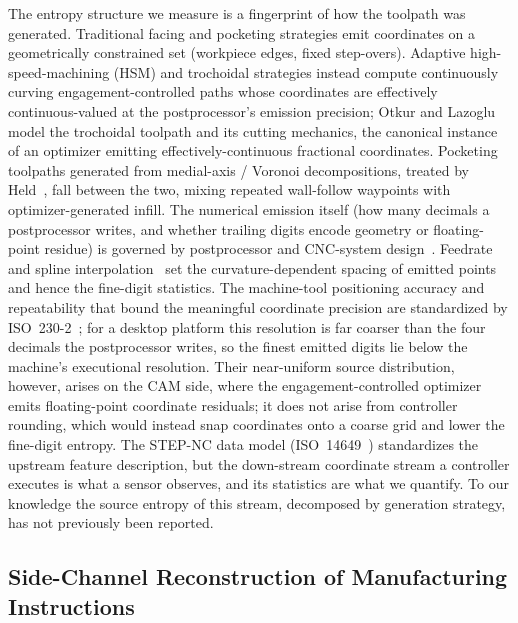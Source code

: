 \documentclass[entropy,article,submit,moreauthors,pdftex]{Definitions/mdpi}
\begin{document}
The entropy structure we measure is a fingerprint of how the toolpath was generated. Traditional facing and pocketing strategies emit coordinates on a geometrically constrained set (workpiece edges, fixed step-overs). Adaptive high-speed-machining (HSM) and trochoidal strategies instead compute continuously curving engagement-controlled paths whose coordinates are effectively continuous-valued at the postprocessor's emission precision; Otkur and Lazoglu~\cite{otkur2007trochoidal} model the trochoidal toolpath and its cutting mechanics, the canonical instance of an optimizer emitting effectively-continuous fractional coordinates. Pocketing toolpaths generated from medial-axis / Voronoi decompositions, treated by Held~\cite{held1991pocket}, fall between the two, mixing repeated wall-follow waypoints with optimizer-generated infill. The numerical emission itself (how many decimals a postprocessor writes, and whether trailing digits encode geometry or floating-point residue) is governed by postprocessor and CNC-system design~\cite{suh2008cnc}. Feedrate and spline interpolation~\cite{zhong2020interpolation} set the curvature-dependent spacing of emitted points and hence the fine-digit statistics. The machine-tool positioning accuracy and repeatability that bound the meaningful coordinate precision are standardized by ISO~230-2~\cite{iso230_2}; for a desktop platform this resolution is far coarser than the four decimals the postprocessor writes, so the finest emitted digits lie below the machine's executional resolution. Their near-uniform source distribution, however, arises on the CAM side, where the engagement-controlled optimizer emits floating-point coordinate residuals; it does not arise from controller rounding, which would instead snap coordinates onto a coarse grid and lower the fine-digit entropy. The STEP-NC data model (ISO~14649~\cite{iso14649}) standardizes the upstream feature description, but the down-stream coordinate stream a controller executes is what a sensor observes, and its statistics are what we quantify. To our knowledge the source entropy of this stream, decomposed by generation strategy, has not previously been reported.

\subsection{Side-Channel Reconstruction of Manufacturing Instructions}
\label{sec:related-sidechan}
\end{document}
